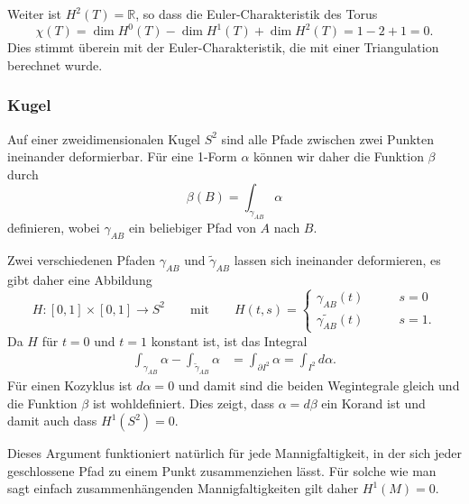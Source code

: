 Weiter ist $H^2(T)=\mathbb{R}$, so dass die Euler-Charakteristik des Torus
\[
\chi(T)
=
\dim H^0(T) - \dim H^1(T) + \dim H^2(T)
=
1-2+1
=
0.
\]
Dies stimmt überein mit der Euler-Charakteristik, die mit einer Triangulation
berechnet wurde.

%
%
\subsubsection{Kugel}
Auf einer zweidimensionalen Kugel $S^2$ sind alle Pfade zwischen zwei
Punkten ineinander deformierbar.
Für eine 1-Form $\alpha$ können wir daher die Funktion $\beta$ durch
\[
\beta(B)
=
\int_{\gamma_{AB}} \alpha
\]
definieren, wobei $\gamma_{AB}$ ein beliebiger Pfad von $A$ nach $B$.

Zwei verschiedenen Pfaden $\gamma_{AB}$ und $\tilde{\gamma}_{AB}$
lassen sich ineinander deformieren, es gibt daher eine Abbildung
\[
H
\colon
[0,1]\times[0,1] \to S^2
\qquad\text{mit}\qquad
H(t,s)
=
\begin{cases}
\gamma_{AB}(t)          &\qquad s=0\\
\tilde{\gamma_{AB}} (t) &\qquad s=1.
\end{cases}
\]
Da $H$ für $t=0$ und $t=1$ konstant ist, ist das Integral 
\begin{align*}
\int_{\gamma_{AB}} \alpha
-
\int_{\tilde{\gamma}_{AB}} \alpha
&=
\int_{\partial I^2} \alpha
=
\int_{I^2} d\alpha.
\end{align*}
Für einen Kozyklus ist $d\alpha=0$ und damit sind die beiden Wegintegrale
gleich und die Funktion $\beta$ ist wohldefiniert.
Dies zeigt, dass $\alpha=d\beta$ ein Korand ist und damit auch dass
$H^1(S^2)=0$.

Dieses Argument funktioniert natürlich für jede Mannigfaltigkeit,
in der sich jeder geschlossene Pfad zu einem Punkt zusammenziehen
lässt.
Für solche wie man sagt einfach zusammenhängenden Mannigfaltigkeiten
gilt daher $H^1(M)=0$.



